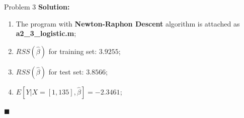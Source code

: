 \documentclass{article}
\newenvironment{solution}                               %
{\textbf{Solution:} }{$\blacksquare$}                   %
\begin{document}
\begin{section}{Problem 3}
        \begin{solution}
            \begin{enumerate}[label=(\alph*)]
                \item The program with \textbf{Newton-Raphon Descent} algorithm is attached as \textbf{a2\_3\_logistic.m};
                \item $RSS(\hat{\beta})$ for training set: $3.9255$;
                \item $RSS(\hat{\beta})$ for test set: $3.8566$;
                \item $E[Y|X=[1,135], \hat{\beta}] = -2.3461$; 
            \end{enumerate}
        \end{solution}
    \end{section}
\end{document}
